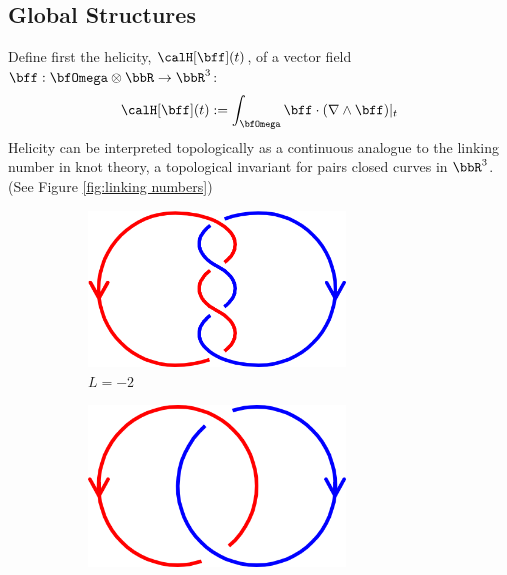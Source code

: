 \subsection*{Global Structures}
    Define first the helicity, $\calH[\bff](t)$, of a vector field $\bff : \bfOmega\otimes\bbR \rightarrow \bbR^{3}$: \cite{Moffatt_1969, Brown_Canfield_Pevtsov_1999}
    \begin{equation}
        \calH[\bff](t)  :=  \int_{\bfOmega}\bff\cdot(\nabla\wedge\bff)|_{t}
    \end{equation}
    Helicity can be interpreted topologically as a continuous analogue to the linking number in knot theory, a topological invariant for pairs closed curves in $\bbR^{3}$. \cite{Berger_1999} (See Figure \ref{fig:linking numbers})

    \begin{figure}[!ht]
        \centering
        \begin{subfigure}{0.1868\textwidth}
            \centering
            \includegraphics[width = 0.75\textwidth]{2 - fluid component/1 - structures/2 - global/images/-2.png}
            \caption{$L = -2$}
        \end{subfigure}%
        \begin{subfigure}{0.1811\textwidth}
            \centering
            \includegraphics[width = 0.75\textwidth]{2 - fluid component/1 - structures/2 - global/images/-1.png}

\end{subfigure}
\end{figure}
